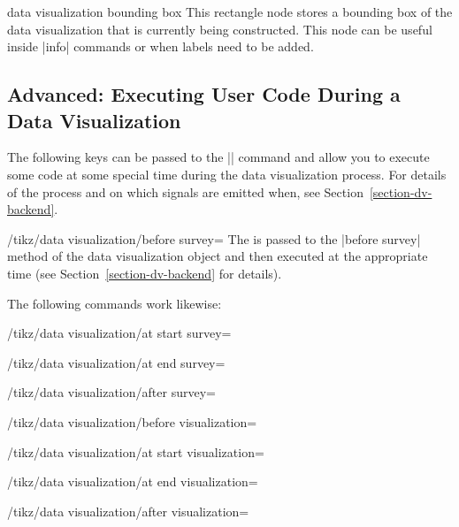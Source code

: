 \begin{predefinednode}{data visualization bounding box}
  This rectangle node stores a bounding box of the data visualization
  that is currently being constructed. This node can be useful inside
  |info| commands or when labels need to be added.
\end{predefinednode}

\subsection{Advanced: Executing User Code During a Data Visualization}
\label{section-dv-user-code}

The following keys can be passed to the |\datavisualization| command
and allow you to execute some code at some special time during the
data visualization process. For details of the process and on which
signals are emitted when,
see Section~\ref{section-dv-backend}.

\begin{key}{/tikz/data visualization/before survey=}
  The  is passed to the |before survey| method of the data
  visualization object and then executed at the appropriate time (see
  Section~\ref{section-dv-backend} for details).

  The following commands work likewise:
\end{key}
\begin{key}{/tikz/data visualization/at start survey=}
\end{key}
\begin{key}{/tikz/data visualization/at end survey=}
\end{key}
\begin{key}{/tikz/data visualization/after survey=}
\end{key}
\begin{key}{/tikz/data visualization/before visualization=}
\end{key}
\begin{key}{/tikz/data visualization/at start visualization=}
\end{key}
\begin{key}{/tikz/data visualization/at end visualization=}
\end{key}
\begin{key}{/tikz/data visualization/after visualization=}
\end{key}



